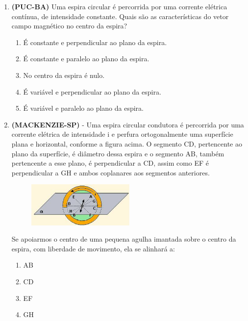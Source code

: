 \documentclass[12pt,letterpaper,fleqn]{article}
\begin{document}
\begin{itemize}
\begin{enumerate}
            \item \textbf{(PUC-BA)} Uma espira circular é percorrida por uma corrente elétrica contínua, de intensidade constante. Quais são as características do vetor campo magnético no centro da espira?
            
            \begin{enumerate}
                \item É constante e perpendicular ao plano da espira. 
                \item É constante e paralelo ao plano da espira.
                \item No centro da espira é nulo.    
                \item É variável e perpendicular ao plano da espira.
                \item É variável e paralelo ao plano da espira.
            \end{enumerate}
            
            \item \textbf{(MACKENZIE-SP)} - Uma espira circular condutora é percorrida por uma corrente elétrica de intensidade i e perfura ortogonalmente uma superfície plana e horizontal, conforme a figura acima. O segmento CD, pertencente ao plano da superfície, é diâmetro dessa espira e o segmento AB, também pertencente a esse plano, é perpendicular a CD, assim como EF é perpendicular a GH e ambos coplanares aos segmentos anteriores.
            
            \begin{figure}[h]
                \centering
                \includegraphics[width=0.5\textwidth]{ex_5.jpg}
            \end{figure}
            
            
             Se apoiarmos o centro de uma pequena agulha imantada sobre o centro da espira, com liberdade de movimento, ela se alinhará a:
             
             \begin{enumerate}
                 \item AB
                 \item CD 
                 \item EF
                 \item GH
             \end{enumerate}
             

\end{enumerate}
\end{itemize}
\end{document}
